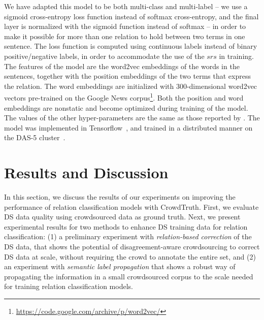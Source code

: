 We have adapted this model to be both multi-class and multi-label -- we use a sigmoid cross-entropy loss function instead of softmax cross-entropy, and the final layer is normalized with the sigmoid function instead of softmax -- in order to make it possible for more than one relation to hold between two terms in one sentence. The loss function is computed using continuous labels instead of binary positive/negative labels, in order to accommodate the use of the $srs$ in training. The features of the model are the word2vec embeddings of the words in the sentences, together with the position embeddings of the two terms that express the relation. The word embeddings are initialized with 300-dimensional word2vec vectors pre-trained on the Google News corpus\footnote{\url{https://code.google.com/archive/p/word2vec/}}. Both the position and word embeddings are nonstatic and become optimized during training of the model. The values of the other hyper-parameters are the same as those reported by \citet{nguyen2015relation}. The model was implemented in Tensorflow~\cite{abadi2016tensorflow}, and trained in a distributed manner on the DAS-5 cluster~\cite{bal2016medium}.



\section{Results and Discussion}

In this section, we discuss the results of our experiments on improving the performance of relation classification models with CrowdTruth. First, we evaluate DS data quality using crowdsourced data as ground truth. Next, we present experimental results for two methods to enhance DS training data for relation classification: (1) a preliminary experiment with \textit{relation-based correction} of the DS data, that shows the potential of disagreement-aware crowdsourcing to correct DS data at scale, without requiring the crowd to annotate the entire set, and (2) an experiment with \textit{semantic label propagation} that shows a robust way of propagating the information in a small crowdsourced corpus to the scale needed for training relation classification models.


